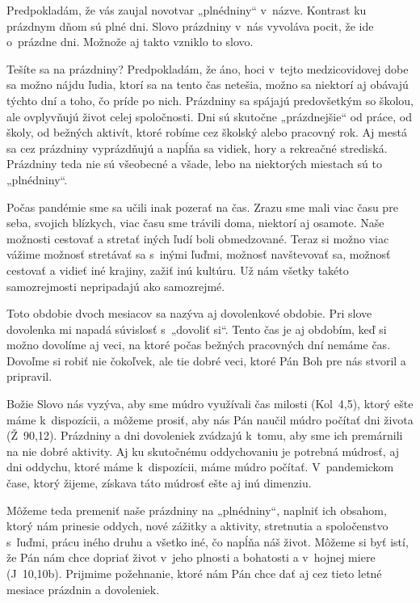 


Predpokladám, že vás zaujal novotvar „plnédniny“ v~názve. Kontrast ku prázdnym dňom sú plné dni. Slovo prázdniny v~nás vyvoláva pocit, že ide o~prázdne dni. Možnože aj takto vzniklo to slovo.

Tešíte sa na prázdniny? Predpokladám, že áno, hoci v~tejto medzicovidovej dobe sa možno nájdu ľudia, ktorí sa na tento čas netešia, možno sa niektorí aj obávajú týchto dní a toho, čo príde po nich. Prázdniny sa spájajú predovšetkým so školou, ale ovplyvňujú život celej spoločnosti. Dni sú skutočne „prázdnejšie“ od práce, od školy, od bežných aktivít, ktoré robíme cez školský alebo pracovný rok. Aj mestá sa cez prázdniny vyprázdňujú a napĺňa sa vidiek, hory a rekreačné strediská. Prázdniny teda nie sú všeobecné a všade, lebo na niektorých miestach sú to „plnédniny“.

Počas pandémie sme sa učili inak pozerať na čas. Zrazu sme mali viac času pre seba, svojich blízkych, viac času sme trávili doma, niektorí aj osamote. Naše možnosti cestovať a stretať iných ľudí boli obmedzované. Teraz si možno viac vážime možnosť stretávať sa s~inými ľuďmi, možnosť navštevovať sa, možnosť cestovať a vidieť iné krajiny, zažiť inú kultúru. Už nám všetky takéto samozrejmosti nepripadajú ako samozrejmé.

Toto obdobie dvoch mesiacov sa nazýva aj dovolenkové obdobie. Pri slove dovolenka mi napadá súvislosť s~„dovoliť si“. Tento čas je aj obdobím, keď si možno dovolíme aj veci, na ktoré počas bežných pracovných dní nemáme čas. Dovoľme si robiť nie čokoľvek, ale tie dobré veci, ktoré Pán Boh pre nás stvoril a pripravil.

Božie Slovo nás vyzýva, aby sme múdro využívali čas milosti (Kol~4,5), ktorý ešte máme k~dispozícii, a môžeme prosiť, aby nás Pán naučil múdro počítať dni života (Ž~90,12). Prázdniny a dni dovoleniek zvádzajú k~tomu, aby sme ich premárnili na nie dobré aktivity. Aj ku skutočnému oddychovaniu je potrebná múdrosť, aj dni oddychu, ktoré máme k~dispozícii, máme múdro počítať. V~pandemickom čase, ktorý žijeme, získava táto múdrosť ešte aj inú dimenziu.

Môžeme teda premeniť naše prázdniny na „plnédniny“, naplniť ich obsahom, ktorý nám prinesie oddych, nové zážitky a aktivity, stretnutia a spoločenstvo s~ľuďmi, prácu iného druhu a všetko iné, čo napĺňa náš život. Môžeme si byť istí, že Pán nám chce dopriať život v~jeho plnosti a bohatosti a v~hojnej miere (J~10,10b). Prijmime požehnanie, ktoré nám Pán chce dať aj cez tieto letné mesiace prázdnin a dovoleniek.

